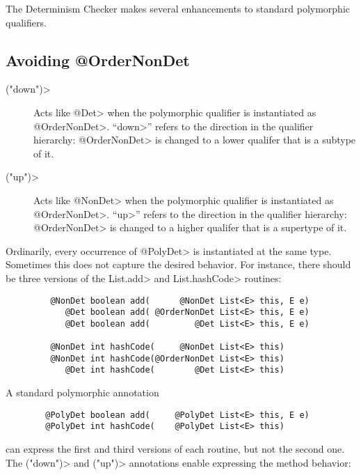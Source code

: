 The Determinism Checker makes
several enhancements to standard polymorphic qualifiers.


\subsection{Avoiding @OrderNonDet\label{determinism-polymorphism-ordernondet}}

\begin{description}
\item[\<("down")>]
  Acts like \<@Det> when the polymorphic qualifier is instantiated as
  \<@OrderNonDet>.
  ``\<down>'' refers to the direction in the qualifier hierarchy:
  \<@OrderNonDet> is changed to a lower qualifer that is a subtype of it.
\item[\<("up")>]
  Acts like \<@NonDet> when the polymorphic qualifier is instantiated as
  \<@OrderNonDet>.
  ``\<up>'' refers to the direction in the qualifier hierarchy:
  \<@OrderNonDet> is changed to a higher qualifer that is a supertype of it.
\end{description}

Ordinarily, every occurrence of \<@PolyDet> is instantiated at the same
type.  Sometimes this does not capture the desired behavior.  For instance,
there should be three versions of the \<List.add> and \<List.hashCode> routines:

\begin{Verbatim}
         @NonDet boolean add(      @NonDet List<E> this, E e)
            @Det boolean add( @OrderNonDet List<E> this, E e)
            @Det boolean add(         @Det List<E> this, E e)

         @NonDet int hashCode(     @NonDet List<E> this)
         @NonDet int hashCode(@OrderNonDet List<E> this)
            @Det int hashCode(        @Det List<E> this)
\end{Verbatim}

A standard polymorphic annotation

\begin{Verbatim}
        @PolyDet boolean add(     @PolyDet List<E> this, E e)
        @PolyDet int hashCode(    @PolyDet List<E> this)
\end{Verbatim}

\noindent
can express the first and third versions of each routine, but not the
second one.  The \<("down")> and
\<("up")> annotations enable
expressing the method behavior:

